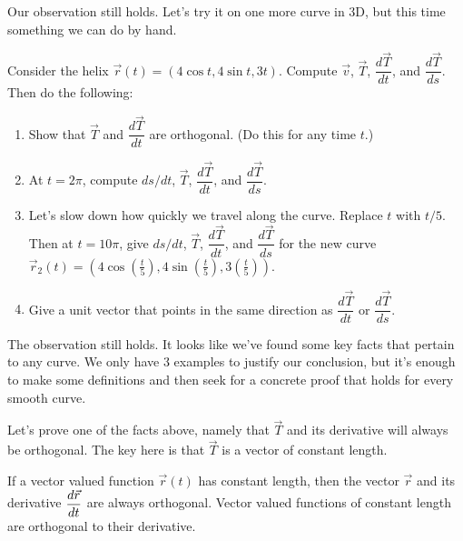 Our observation still holds.  Let's try it on one more curve in 3D, but this time something we can do by hand.
\begin{problem}
 Consider the helix $\vec r(t)=(4\cos t,4\sin t, 3t)$.  Compute $\vec v$, $\vec T$, $\dfrac{d\vec T}{dt}$, and $\dfrac{d\vec T}{ds}$. Then do the following:
\begin{enumerate}
 \item Show that $\vec T$ and $\dfrac{d\vec T}{dt}$ are orthogonal. (Do this for any time $t$.)
\item At $t=2\pi$, compute $ds/dt$, $\vec T$, $\dfrac{d\vec T}{dt}$, and $\dfrac{d\vec T}{ds}$.
 \item Let's slow down how quickly we travel along the curve.  Replace $t$ with $t/5$.  Then at $t=10\pi$, give $ds/dt$, $\vec T$, $\dfrac{d\vec T}{dt}$, and $\dfrac{d\vec T}{ds}$ for the new curve $\vec r_2(t) =(4\cos(\frac{t}{5}),4\sin(\frac{t}{5}), 3(\frac{t}{5}))$.
 \item Give a unit vector that points in the same direction as $\dfrac{d\vec T}{dt}$ or $\dfrac{d\vec T}{ds}$.
\end{enumerate}

\end{problem}

The observation still holds. It looks like we've found some key facts that pertain to any curve.  We only have 3 examples to justify our conclusion, but it's enough to make some definitions and then seek for a concrete proof that holds for every smooth curve.

Let's prove one of the facts above, namely that $\vec T$ and its derivative will always be orthogonal.  The key here is that $\vec T$ is a vector of constant length.
\begin{theorem}\label{vector valued functions of constant length}
 If a vector valued function $\vec r(t)$ has constant length, then the vector $\vec r$ and its derivative $\displaystyle\frac{d\vec r}{dt}$ are always orthogonal. Vector valued functions of constant length are orthogonal to their derivative.  
\end{theorem}

